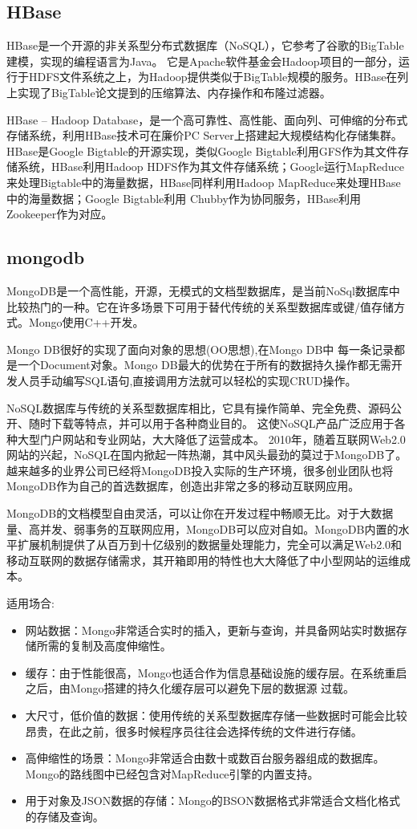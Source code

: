 \subsection{HBase}

HBase是一个开源的非关系型分布式数据库（NoSQL），它参考了谷歌的BigTable建模，实现的编程语言为Java。
它是Apache软件基金会Hadoop项目的一部分，运行于HDFS文件系统之上，为Hadoop提供类似于BigTable规模的服务。HBase在列上实现了BigTable论文提到的压缩算法、内存操作和布隆过滤器。

HBase – Hadoop Database，是一个高可靠性、高性能、面向列、可伸缩的分布式存储系统，利用HBase技术可在廉价PC Server上搭建起大规模结构化存储集群。
HBase是Google Bigtable的开源实现，类似Google Bigtable利用GFS作为其文件存储系统，HBase利用Hadoop HDFS作为其文件存储系统；Google运行MapReduce来处理Bigtable中的海量数据，HBase同样利用Hadoop MapReduce来处理HBase中的海量数据；Google Bigtable利用 Chubby作为协同服务，HBase利用Zookeeper作为对应。
　　
　　
\subsection{mongodb}

MongoDB是一个高性能，开源，无模式的文档型数据库，是当前NoSql数据库中比较热门的一种。它在许多场景下可用于替代传统的关系型数据库或键/值存储方式。Mongo使用C++开发。

Mongo DB很好的实现了面向对象的思想(OO思想),在Mongo DB中 每一条记录都是一个Document对象。Mongo DB最大的优势在于所有的数据持久操作都无需开发人员手动编写SQL语句,直接调用方法就可以轻松的实现CRUD操作。

NoSQL数据库与传统的关系型数据库相比，它具有操作简单、完全免费、源码公开、随时下载等特点，并可以用于各种商业目的。
这使NoSQL产品广泛应用于各种大型门户网站和专业网站，大大降低了运营成本。
2010年，随着互联网Web2.0网站的兴起，NoSQL在国内掀起一阵热潮，其中风头最劲的莫过于MongoDB了。
越来越多的业界公司已经将MongoDB投入实际的生产环境，很多创业团队也将MongoDB作为自己的首选数据库，创造出非常之多的移动互联网应用。

MongoDB的文档模型自由灵活，可以让你在开发过程中畅顺无比。对于大数据量、高并发、弱事务的互联网应用，MongoDB可以应对自如。MongoDB内置的水平扩展机制提供了从百万到十亿级别的数据量处理能力，完全可以满足Web2.0和移动互联网的数据存储需求，其开箱即用的特性也大大降低了中小型网站的运维成本。

适用场合:
\begin{itemize}
\item 网站数据：Mongo非常适合实时的插入，更新与查询，并具备网站实时数据存储所需的复制及高度伸缩性。
\item 缓存：由于性能很高，Mongo也适合作为信息基础设施的缓存层。在系统重启之后，由Mongo搭建的持久化缓存层可以避免下层的数据源 过载。
\item 大尺寸，低价值的数据：使用传统的关系型数据库存储一些数据时可能会比较昂贵，在此之前，很多时候程序员往往会选择传统的文件进行存储。
\item 高伸缩性的场景：Mongo非常适合由数十或数百台服务器组成的数据库。Mongo的路线图中已经包含对MapReduce引擎的内置支持。
\item 用于对象及JSON数据的存储：Mongo的BSON数据格式非常适合文档化格式的存储及查询。
\end{itemize}


